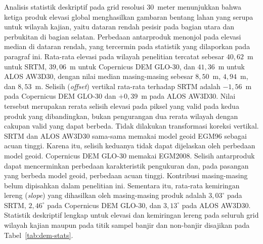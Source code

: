 \documentclass[12pt,a4paper]{article}
\begin{document}
Analisis statistik deskriptif pada grid resolusi 30~meter menunjukkan bahwa
ketiga produk elevasi global menghasilkan gambaran bentang lahan yang serupa
untuk wilayah kajian, yaitu dataran rendah pesisir pada bagian utara dan
perbukitan di bagian selatan. Perbedaan antarproduk menonjol pada elevasi
median di dataran rendah, yang tercermin pada statistik yang dilaporkan pada
paragraf ini.
Rata-rata elevasi pada wilayah penelitian tercatat sebesar $40{,}62$~m untuk
SRTM, $39{,}06$~m untuk Copernicus DEM GLO-30, dan $41{,}36$~m untuk ALOS
AW3D30, dengan nilai median masing-masing sebesar $8{,}50$~m, $4{,}94$~m, dan
$8{,}53$~m. Selisih (\textit{offset}) vertikal rata-rata terhadap SRTM adalah
$-1{,}56$~m pada Copernicus DEM GLO-30 dan $+0{,}39$~m pada ALOS AW3D30. Nilai
tersebut merupakan rerata selisih elevasi pada piksel yang valid pada
kedua produk yang dibandingkan, bukan pengurangan dua rerata wilayah
dengan cakupan valid yang dapat berbeda. Tidak dilakukan transformasi
koreksi vertikal. SRTM dan ALOS AW3D30 sama-sama memakai model geoid EGM96
sebagai acuan tinggi. Karena itu, selisih keduanya tidak dapat dijelaskan
oleh perbedaan model geoid. Copernicus DEM GLO-30 memakai EGM2008.
Selisih antarproduk dapat mencerminkan perbedaan karakteristik pengukuran
dan, pada pasangan yang berbeda model geoid, perbedaan acuan tinggi.
Kontribusi masing-masing belum dipisahkan dalam penelitian ini.
Sementara itu, rata-rata
kemiringan lereng (\textit{slope}) yang dihasilkan oleh masing-masing produk
adalah $3{,}03^{\circ}$ pada SRTM, $2{,}46^{\circ}$ pada Copernicus DEM GLO-30,
dan $3{,}13^{\circ}$ pada ALOS AW3D30. Statistik deskriptif lengkap untuk elevasi
dan kemiringan lereng pada seluruh grid wilayah kajian maupun pada titik sampel
banjir dan non-banjir disajikan pada Tabel~\ref{tab:dem-stats}.
\end{document}
